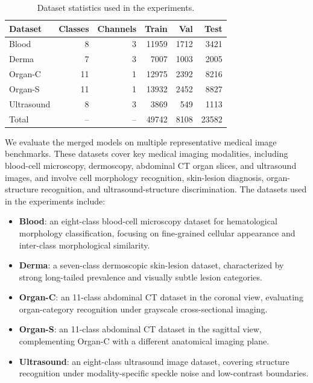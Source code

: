 \documentclass[letterpaper]{article} %
\begin{document}
\begin{table}[t]
\centering
\caption{Dataset statistics used in the experiments.}
\label{tab:dataset-stats}
\scriptsize
\setlength{\tabcolsep}{3.2pt}
\begin{tabular}{lrrrrr}
\hline
Dataset & Classes & Channels & Train & Val & Test \\
\hline
Blood & 8 & 3 & 11959 & 1712 & 3421 \\
Derma & 7 & 3 & 7007 & 1003 & 2005 \\
Organ-C & 11 & 1 & 12975 & 2392 & 8216 \\
Organ-S & 11 & 1 & 13932 & 2452 & 8827 \\
Ultrasound & 8 & 3 & 3869 & 549 & 1113 \\
\hline
Total & -- & -- & 49742 & 8108 & 23582 \\
\hline
\end{tabular}
\end{table}

We evaluate the merged models on multiple representative medical image benchmarks. These datasets cover key medical imaging modalities, including blood-cell microscopy, dermoscopy, abdominal CT organ slices, and ultrasound images, and involve cell morphology recognition, skin-lesion diagnosis, organ-structure recognition, and ultrasound-structure discrimination. The datasets used in the experiments include:

\begin{itemize}
\item \textbf{Blood}: an eight-class blood-cell microscopy dataset for hematological morphology classification, focusing on fine-grained cellular appearance and inter-class morphological similarity.
\item \textbf{Derma}: a seven-class dermoscopic skin-lesion dataset, characterized by strong long-tailed prevalence and visually subtle lesion categories.
\item \textbf{Organ-C}: an 11-class abdominal CT dataset in the coronal view, evaluating organ-category recognition under grayscale cross-sectional imaging.
\item \textbf{Organ-S}: an 11-class abdominal CT dataset in the sagittal view, complementing Organ-C with a different anatomical imaging plane.
\item \textbf{Ultrasound}: an eight-class ultrasound image dataset, covering structure recognition under modality-specific speckle noise and low-contrast boundaries.
\end{itemize}
\end{document}
